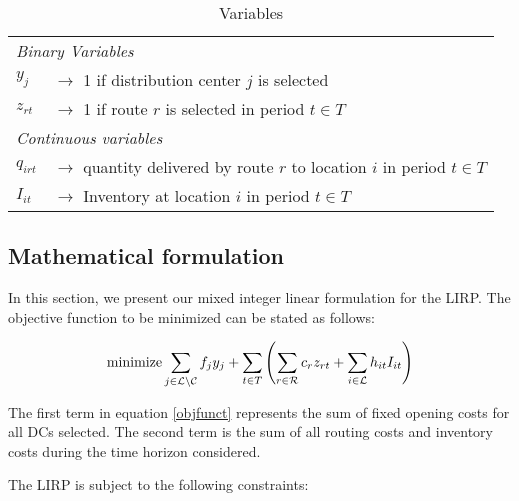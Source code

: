 \documentclass[a4paper,10pt]{article}
\begin{document}
\begin{linenumbers}
	\begin{table}[htbp]
	\centering
	\begin{tabular}{ll}
		\toprule
		\multicolumn{2}{l}{\textit{Binary Variables}}\\
		$y_{j}$ & $\rightarrow$ 1 if distribution center $j$ is selected \\
		$z_{rt}$ & $\rightarrow$ 1 if route $r$  is selected in period $t \in T$\\
		\midrule
		\multicolumn{2}{l}{\textit{Continuous variables}}\\
		$q_{irt}$ & $\rightarrow$ quantity delivered by route $r$ to location $i$ in period $t\in T$\\
		$I_{it}$ & $\rightarrow$ Inventory at location $i$ in period $t \in T$\\
		\bottomrule
	\end{tabular}
	\caption{Variables}
	\label{tab:var}
\end{table}    


\subsection{Mathematical  formulation}\label{subsection:MIP}

In this section, we present our mixed integer linear formulation for the LIRP. 
The objective function to be minimized can be stated as follows: 
 
\begin{equation} \label{objfunct}
    \text{minimize} \sum_{j\in \mathcal{L} \setminus \mathcal{C}} f_{j} y_{j} +\sum_{t\in T} \left( \sum_{r\in \mathcal{R}} c_r z_{rt} + \sum_{i\in \mathcal{L}} h_{it} I_{it}\right)
    \end{equation} 
    
    The first term in equation \ref{objfunct} represents the sum of fixed opening costs for all DCs selected. 
    The second term is the sum of all routing costs and inventory costs during the time horizon considered. 
    
  The LIRP is subject to the following constraints:
    

\end{linenumbers}
\end{document}
